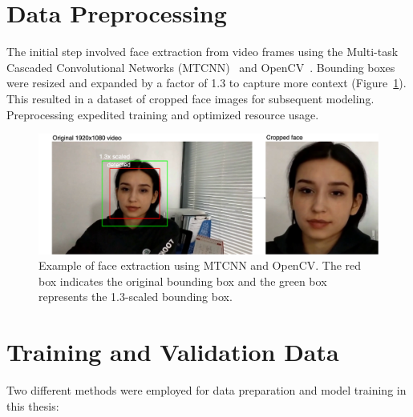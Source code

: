 \documentclass[a4paper,12pt,openright]{book}
\begin{document}
\section{Data Preprocessing}

The initial step involved face extraction from video frames using the Multi-task Cascaded Convolutional Networks (MTCNN)~\cite{DBLP:journals/corr/ZhangZL016} and OpenCV~\cite{opencv_library}. Bounding boxes were resized and expanded by a factor of 1.3 to capture more context (Figure~\ref{fig:MTCCN}). This resulted in a dataset of cropped face images for subsequent modeling. Preprocessing expedited training and optimized resource usage.


\begin{figure}[!htb]
    \centering
    \includegraphics[trim={0cm 0cm 0cm 0cm},clip,width=\textwidth]{images/resultof.png}
    \caption{Example of face extraction using MTCNN and OpenCV. The red box indicates the original bounding box and the green box represents the 1.3-scaled bounding box.}

    \label{fig:MTCCN}
\end{figure}


\section{Training and Validation Data}

Two different methods were employed for data preparation and model training in this thesis:
\end{document}
